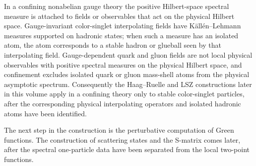\begin{remark}
In a confining nonabelian gauge theory the positive Hilbert-space spectral
measure is attached to fields or observables that act on the physical Hilbert
space.  Gauge-invariant color-singlet interpolating fields have
K\"all\'en--Lehmann measures supported on hadronic states; when such a measure
has an isolated atom, the atom corresponds to a stable hadron or glueball seen
by that interpolating field.  Gauge-dependent quark and gluon fields are not
local physical observables with positive spectral measures on the physical
Hilbert space, and confinement excludes isolated quark or gluon mass-shell
atoms from the physical asymptotic spectrum.  Consequently the Haag--Ruelle and
LSZ constructions later in this volume apply in a confining theory only to
stable color-singlet particles, after the corresponding physical interpolating
operators and isolated hadronic atoms have been identified.
\end{remark}

The next step in the construction is the perturbative computation of Green
functions. The construction of scattering states and the S-matrix comes later,
after the spectral one-particle data have been separated from the local
two-point functions.
